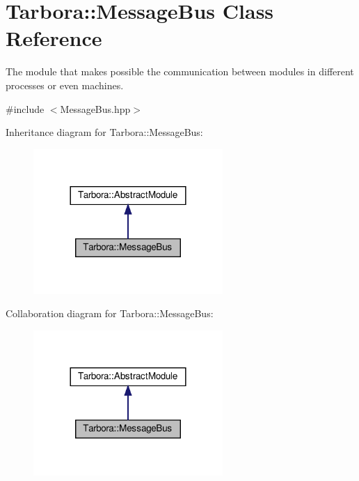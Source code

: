 \hypertarget{classTarbora_1_1MessageBus}{}\section{Tarbora\+:\+:Message\+Bus Class Reference}
\label{classTarbora_1_1MessageBus}


The module that makes possible the communication between modules in different processes or even machines.  




{\ttfamily \#include $<$Message\+Bus.\+hpp$>$}



Inheritance diagram for Tarbora\+:\+:Message\+Bus\+:
\nopagebreak
\begin{figure}[H]
\begin{center}
\leavevmode
\includegraphics[width=204pt]{classTarbora_1_1MessageBus__inherit__graph}
\end{center}
\end{figure}


Collaboration diagram for Tarbora\+:\+:Message\+Bus\+:
\nopagebreak
\begin{figure}[H]
\begin{center}
\leavevmode
\includegraphics[width=204pt]{classTarbora_1_1MessageBus__coll__graph}
\end{center}
\end{figure}
